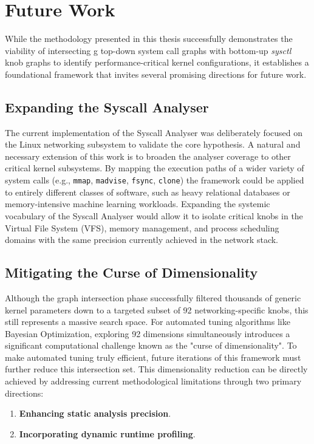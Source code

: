 \chapter{Future Work} \label{ch:future_work}

While the methodology presented in this thesis successfully demonstrates the viability of intersecting g top-down system call graphs with bottom-up \textit{sysctl} knob graphs to identify performance-critical kernel configurations, it establishes a foundational framework that invites several promising directions for future work.

\section{Expanding the Syscall Analyser}

The current implementation of the Syscall Analyser was deliberately focused on the Linux networking subsystem to validate the core hypothesis.
A natural and necessary extension of this work is to broaden the analyser coverage to other critical kernel subsystems.
By mapping the execution paths of a wider variety of system calls (e.g., \texttt{mmap}, \texttt{madvise}, \texttt{fsync}, \texttt{clone}) the framework could be applied to entirely different classes of software, such as heavy relational databases or memory-intensive machine learning workloads.
Expanding the systemic vocabulary of the Syscall Analyser would allow it to isolate critical knobs in the Virtual File System (VFS), memory management, and process scheduling domains with the same precision currently achieved in the network stack.

\section{Mitigating the Curse of Dimensionality}

Although the graph intersection phase successfully filtered thousands of generic kernel parameters down to a targeted subset of 92 networking-specific knobs, this still represents a massive search space.
For automated tuning algorithms like Bayesian Optimization, exploring 92 dimensions simultaneously introduces a significant computational challenge known as the "curse of dimensionality".
To make automated tuning truly efficient, future iterations of this framework must further reduce this intersection set.
This dimensionality reduction can be directly achieved by addressing current methodological limitations through two primary directions: 
\begin{enumerate}
    \item \textbf{Enhancing static analysis precision}.
    \item \textbf{Incorporating dynamic runtime profiling}.
\end{enumerate}


